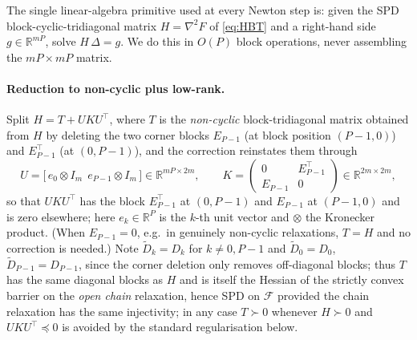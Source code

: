 \documentclass{amsart}
\newcommand{\R}{\mathbb{R}}
\begin{document}
The single linear-algebra primitive used at every Newton step is: given the SPD
block-cyclic-tridiagonal matrix $H=\nabla^2F$ of \eqref{eq:HBT} and a right-hand
side $g\in\R^{mP}$, solve $H\,\Delta=g$. We do this in $O(P)$ block operations,
never assembling the $mP\times mP$ matrix.

\paragraph{Reduction to non-cyclic plus low-rank.}
Split $H=T+UKU^{\!\top}$, where $T$ is the \emph{non-cyclic} block-tridiagonal matrix
obtained from $H$ by deleting the two corner blocks $E_{P-1}$ (at block position
$(P-1,0)$) and $E_{P-1}^{\!\top}$ (at $(0,P-1)$), and the correction reinstates them
through
\begin{equation}\label{eq:UKV}
  U=\big[\,e_{0}\otimes I_m\ \ e_{P-1}\otimes I_m\,\big]\in\R^{mP\times2m},
  \qquad
  K=\begin{pmatrix}0 & E_{P-1}^{\!\top}\\ E_{P-1} & 0\end{pmatrix}\in\R^{2m\times2m},
\end{equation}
so that $UKU^{\!\top}$ has the block $E_{P-1}^{\!\top}$ at $(0,P-1)$ and $E_{P-1}$ at
$(P-1,0)$ and is zero elsewhere; here $e_k\in\R^{P}$ is the $k$-th unit vector and
$\otimes$ the Kronecker product. (When $E_{P-1}=0$, e.g.\ in genuinely non-cyclic
relaxations, $T=H$ and no correction is needed.) Note $\widetilde D_k=D_k$ for
$k\neq 0,P-1$ and $\widetilde D_0=D_0$, $\widetilde D_{P-1}=D_{P-1}$, since the
corner deletion only removes off-diagonal blocks; thus $T$ has the same diagonal
blocks as $H$ and is itself the Hessian of the strictly convex barrier on the
\emph{open chain} relaxation, hence SPD on $\mathcal F$ provided the chain
relaxation has the same injectivity; in any case $T\succ0$ whenever $H\succ0$ and
$UKU^{\!\top}\preceq0$ is avoided by the standard regularisation below.
\end{document}

